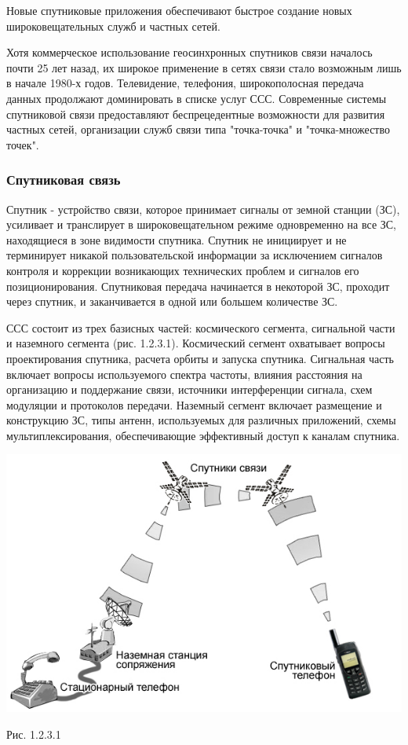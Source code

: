 \documentclass[a4paper]{report}
\begin{document}
Новые спутниковые приложения обеспечивают быстрое создание новых широковещательных служб и частных сетей.

Хотя коммерческое использование геосинхронных спутников связи началось почти 25 лет назад, их широкое применение в сетях связи стало возможным лишь в начале 1980-х годов. Телевидение, телефония, широкополосная передача данных продолжают доминировать в списке услуг ССС. Современные системы спутниковой связи предоставляют беспрецедентные возможности для развития частных сетей, организации служб связи типа "точка-точка" и "точка-множество точек".

\subsubsection{Спутниковая связь}
Спутник - устройство связи, которое принимает сигналы от земной станции (ЗС), усиливает и транслирует в широковещательном режиме одновременно на все ЗС, находящиеся в зоне видимости спутника. Спутник не инициирует и не терминирует никакой пользовательской информации за исключением сигналов контроля и коррекции возникающих технических проблем и сигналов его позиционирования. Спутниковая передача начинается в некоторой ЗС, проходит через спутник, и заканчивается в одной или большем количестве ЗС.

ССС состоит из трех базисных частей: космического сегмента, сигнальной части и наземного сегмента (рис. 1.2.3.1). Космический сегмент охватывает вопросы проектирования спутника, расчета орбиты и запуска спутника. Сигнальная часть включает вопросы используемого спектра частоты, влияния расстояния на организацию и поддержание связи, источники интерференции сигнала, схем модуляции и протоколов передачи. Наземный сегмент включает размещение и конструкцию ЗС, типы антенн, используемых для различных приложений, схемы мультиплексирования, обеспечивающие эффективный доступ к каналам спутника.

\newpage
\includegraphics[scale=0.7]{70}
{\centering\caption{\newline Рис. 1.2.3.1}\\}
\end{document}
